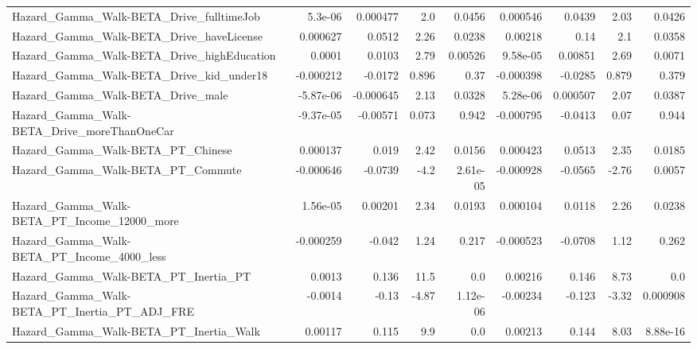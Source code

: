 \begin{tabular}{lrrrrrrrr}
Hazard\_Gamma\_Walk-BETA\_Drive\_fulltimeJob           &     5.3e-06 &     0.000477 &      2.0 &   0.0456 &   0.000546 &      0.0439 &         2.03 &        0.0426 \\
Hazard\_Gamma\_Walk-BETA\_Drive\_haveLicense           &    0.000627 &       0.0512 &     2.26 &   0.0238 &    0.00218 &        0.14 &          2.1 &        0.0358 \\
Hazard\_Gamma\_Walk-BETA\_Drive\_highEducation         &      0.0001 &       0.0103 &     2.79 &  0.00526 &   9.58e-05 &     0.00851 &         2.69 &        0.0071 \\
Hazard\_Gamma\_Walk-BETA\_Drive\_kid\_under18           &   -0.000212 &      -0.0172 &    0.896 &     0.37 &  -0.000398 &     -0.0285 &        0.879 &         0.379 \\
Hazard\_Gamma\_Walk-BETA\_Drive\_male                  &   -5.87e-06 &    -0.000645 &     2.13 &   0.0328 &   5.28e-06 &    0.000507 &         2.07 &        0.0387 \\
Hazard\_Gamma\_Walk-BETA\_Drive\_moreThanOneCar        &   -9.37e-05 &     -0.00571 &    0.073 &    0.942 &  -0.000795 &     -0.0413 &         0.07 &         0.944 \\
Hazard\_Gamma\_Walk-BETA\_PT\_Chinese                  &    0.000137 &        0.019 &     2.42 &   0.0156 &   0.000423 &      0.0513 &         2.35 &        0.0185 \\
Hazard\_Gamma\_Walk-BETA\_PT\_Commute                  &   -0.000646 &      -0.0739 &     -4.2 & 2.61e-05 &  -0.000928 &     -0.0565 &        -2.76 &        0.0057 \\
Hazard\_Gamma\_Walk-BETA\_PT\_Income\_12000\_more        &    1.56e-05 &      0.00201 &     2.34 &   0.0193 &   0.000104 &      0.0118 &         2.26 &        0.0238 \\
Hazard\_Gamma\_Walk-BETA\_PT\_Income\_4000\_less         &   -0.000259 &       -0.042 &     1.24 &    0.217 &  -0.000523 &     -0.0708 &         1.12 &         0.262 \\
Hazard\_Gamma\_Walk-BETA\_PT\_Inertia\_PT               &      0.0013 &        0.136 &     11.5 &      0.0 &    0.00216 &       0.146 &         8.73 &           0.0 \\
Hazard\_Gamma\_Walk-BETA\_PT\_Inertia\_PT\_ADJ\_FRE       &     -0.0014 &        -0.13 &    -4.87 & 1.12e-06 &   -0.00234 &      -0.123 &        -3.32 &      0.000908 \\
Hazard\_Gamma\_Walk-BETA\_PT\_Inertia\_Walk             &     0.00117 &        0.115 &      9.9 &      0.0 &    0.00213 &       0.144 &         8.03 &      8.88e-16 \\

\end{tabular}
